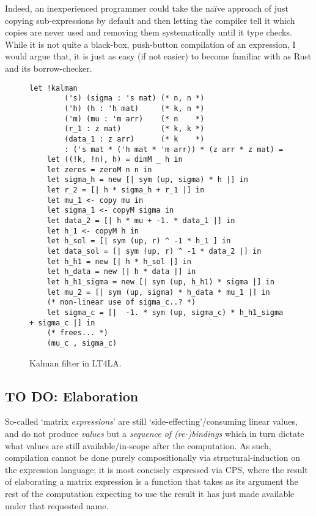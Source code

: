 Indeed, an inexperienced programmer could take the  na\"ive approach of just
copying sub-expressions by default and then letting the compiler tell it which
copies are never used and removing them systematically until it type checks.
While it is not quite a black-box, push-button compilation of an expression, I
would argue that, it is just as easy (if not easier) to become familiar with as
Rust and its borrow-checker.

\begin{figure}[tb]

    \begin{verbatim}
let !kalman
        ('s) (sigma : 's mat) (* n, n *)
        ('h) (h : 'h mat)     (* k, n *)
        ('m) (mu : 'm arr)    (* n    *)
        (r_1 : z mat)         (* k, k *)
        (data_1 : z arr)      (* k    *)
        : ('s mat * ('h mat * 'm arr)) * (z arr * z mat) =
    let ((!k, !n), h) = dimM _ h in
    let zeros = zeroM n n in
    let sigma_h = new [| sym (up, sigma) * h |] in
    let r_2 = [| h * sigma_h + r_1 |] in
    let mu_1 <- copy mu in
    let sigma_1 <- copyM sigma in
    let data_2 = [| h * mu + -1. * data_1 |] in
    let h_1 <- copyM h in
    let h_sol = [| sym (up, r) ^ -1 * h_1 ] in
    let data_sol = [| sym (up, r) ^ -1 * data_2 |] in
    let h_h1 = new [| h * h_sol |] in
    let h_data = new [| h * data |] in
    let h_h1_sigma = new [| sym (up, h_h1) * sigma |] in
    let mu_2 = [| sym (up, sigma) * h_data * mu_1 |] in
    (* non-linear use of sigma_c..? *)
    let sigma_c = [|  -1. * sym (up, sigma_c) * h_h1_sigma + sigma_c |] in
    (* frees... *)
    (mu_c , sigma_c)
    \end{verbatim}

    \caption{Kalman filter in LT4LA.}\label{fig:ltfla_kalman}

\end{figure}

\subsection{TO DO: Elaboration}

So-called `matrix \emph{expressions}' are still `side-effecting'/consuming
linear values, and do not produce \emph{values} but a \emph{sequence of
(re-)bindings} which in turn dictate what values are still available/in-scope
after the computation.  As such, compilation cannot be done purely
compositionally via structural-induction on the expression language; it is most
concisely expressed via CPS, where the result of elaborating a matrix
expression is a function that takes as its argument the rest of the computation
expecting to use the result it has just made available under that requested
name.


